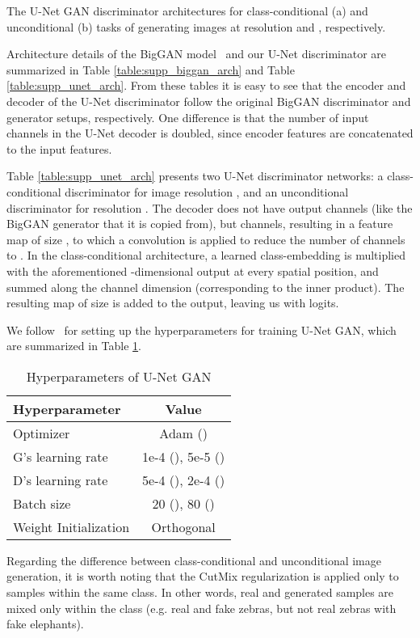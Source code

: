 \documentclass[10pt,twocolumn,letterpaper]{article}
\begin{document}
\begin{table*}
\begin{minipage}[t]{.45\textwidth}
	\end{minipage}	
\caption{The U-Net GAN discriminator architectures for class-conditional (a) and unconditional (b) tasks of generating images at resolution  and , respectively.} \label{table:supp_unet_arch} \end{table*}
 
Architecture details of the BigGAN model~\cite{Brock2019} and our U-Net discriminator are summarized in Table \ref{table:supp_biggan_arch} and Table \ref{table:supp_unet_arch}. From these tables it is easy to see that the encoder and decoder of the U-Net discriminator follow the original BigGAN discriminator and generator setups, respectively. One difference is that the number of input channels in the U-Net decoder is doubled, since encoder features are concatenated to the input features. 

Table \ref{table:supp_unet_arch} presents two U-Net discriminator networks: a class-conditional discriminator for image resolution , and an unconditional discriminator for resolution . The decoder does not have  output channels (like the BigGAN generator that it is copied from), but  channels, resulting in a feature map  of size , to which a  convolution is applied to reduce the number of channels to . In the class-conditional architecture, a learned class-embedding is multiplied with the aforementioned -dimensional output  at every spatial position, and summed along the channel dimension (corresponding to the inner product). The resulting map of size  is added to the output, leaving us with  logits. 


We follow~\cite{Brock2019} for setting up the hyperparameters for training U-Net GAN, which are summarized in Table \ref{table:hp}.
\begin{table}[H]
\begin{center}
\begin{tabular}{ |l|c| } 
 \hline
 Hyperparameter & Value \\ 
 \hline
 Optimizer & Adam ()  \\ 
 G's learning rate  & 1e-4 (), 5e-5 ()  \\ 
 D's learning rate  & 5e-4 (), 2e-4 () \\ 
 Batch size & 20 (), 80 () \\ 
 Weight Initialization & Orthogonal \\
\hline
\end{tabular}
\end{center}
\caption{Hyperparameters of U-Net GAN}\label{table:hp}
\end{table}
 
Regarding the difference between class-conditional and unconditional image generation, it is worth noting that the CutMix regularization is applied only to samples within the same class. In other words, real and generated samples are mixed only within the class (e.g. real and fake zebras, but not real zebras with fake elephants).

 
\end{document}
